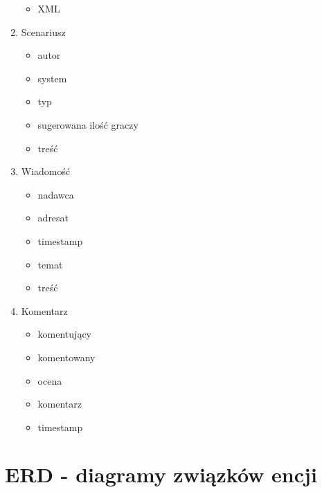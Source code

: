 \begin{enumerate}
\begin{itemize}
	\item XML
	\end{itemize}
\item Scenariusz
	\begin{itemize}
	\item autor
	\item system
	\item typ
	\item sugerowana ilość graczy
	\item treść
	\end{itemize}
\item Wiadomość
	\begin{itemize}
	\item nadawca
	\item adresat
	\item timestamp
	\item temat
	\item treść
	\end{itemize}
\item Komentarz
	\begin{itemize}
	\item komentujący
	\item komentowany
	\item ocena
	\item komentarz
	\item timestamp
	\end{itemize}
\end{enumerate}


\clearpage
\section{ERD - diagramy związków encji}
\label{sec:ERD}

